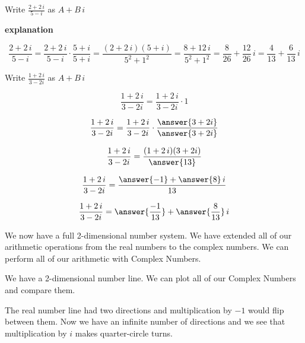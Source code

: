 \documentclass{ximera}
\begin{document}
\begin{example}




Write $\frac{2 + 2 \, i}{5 - i}$ as $A + B \, i$


\textbf{\textcolor{red!75!green}{explanation}} 

\[
\frac{2 + 2 \, i}{5 - i} = \frac{2 + 2 \, i}{5 - i} \cdot \frac{5 + i}{5 + i} = \frac{(2 + 2 \, i)(5 + i)}{5^2 + 1^2} = \frac{8 + 12 \, i}{5^2 + 1^2} = \frac{8}{26} + \frac{12}{26} \, i = \frac{4}{13} + \frac{6}{13} \, i
\]






\end{example}







\begin{question}


Write $\frac{1 + 2 \, i}{3 - 2i}$ as $A + B \, i$



\[
\frac{1 + 2 \, i}{3 - 2i} = \frac{1 + 2 \, i}{3 - 2i} \cdot  1
\]


\[
\frac{1 + 2 \, i}{3 - 2i} = \frac{1 + 2 \, i}{3 - 2i} \cdot  \frac{\answer{3 + 2i}}{\answer{3 + 2i}}
\]


\[
\frac{1 + 2 \, i}{3 - 2i} = \frac{(1 + 2 \, i)(3 + 2i)}{\answer{13}} 
\]


\[
\frac{1 + 2 \, i}{3 - 2i} = \frac{\answer{-1} + \answer{8} \, i}{13} 
\]


\[
\frac{1 + 2 \, i}{3 - 2i} = \answer{\frac{-1}{13}} + \answer{\frac{8}{13}} \, i
\]

\end{question}







We now have a full 2-dimensional number system.  We have extended all of our arithmetic operations from the real numbers to the complex numbers.  We can perform all of our arithmetic with Complex Numbers.



We have a 2-dimensional number line. We can plot all of our Complex Numbers and compare them.

The real number line had two directions and multiplication by $-1$ would flip between them.  Now we have an infinite number of directions and we see that multiplication by $i$ makes quarter-circle turns.
\end{document}
